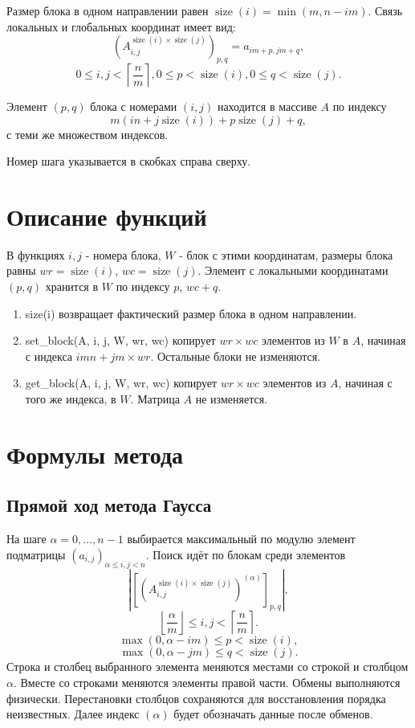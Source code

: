 \documentclass[a4paper,12pt]{article}
\begin{document}
Размер блока в одном направлении равен $\operatorname{size}(i) = \min(m, n - i m)$. Связь локальных и глобальных координат имеет вид:
\[
    \left(A_{i, j}^{\operatorname{size}(i) \times \operatorname{size}(j)} \right)_{p, q} = a_{i m + p, j m + q},
\]
\[
    0 \leq i, j < \left\lceil \frac{n}{m} \right\rceil, 0 \leq p < \operatorname{size}(i), 0 \leq q < \operatorname{size}(j).
\]

Элемент $(p, q)$ блока с номерами $(i, j)$ находится в массиве $A$ по индексу
\[
    m (i n + j \operatorname{size}(i)) + p \operatorname{size}(j) + q,
\]
с теми же множеством индексов.

Номер шага указывается в скобках справа сверху.

\section{Описание функций}
В функциях $i, j$ - номера блока, $W$ - блок с этими координатам, размеры блока равны $wr = \operatorname{size}(i)$, $wc = \operatorname{size}(j)$. Элемент с локальными координатами $(p, q)$ хранится в $W$ по индексу $p$, $wc + q$.

\begin{enumerate}
    \item size(i) возвращает фактический размер блока в одном направлении.
    \item set\_block(A, i, j, W, wr, wc) копирует $wr \times wc$ элементов из $W$ в $A$, начиная с индекса $i m n + j m \times wr$. Остальные блоки не изменяются.
    \item get\_block(A, i, j, W, wr, wc) копирует $wr \times wc$ элементов из $A$, начиная с того же индекса, в $W$. Матрица $A$ не изменяется.
\end{enumerate}

\section{Формулы метода}
\subsection{Прямой ход метода Гаусса}
На шаге $\alpha = 0, \ldots, n - 1$ выбирается максимальный по модулю элемент подматрицы $(a_{i, j})_{\alpha \leq i, j < n}$. Поиск идёт по блокам среди элементов
\[
    \left| \left[ \left(A_{i, j}^{\operatorname{size}(i) \times \operatorname{size}(j)} \right)^{(\alpha)} \right]_{p, q} \right|,
\]
\[
    \left\lfloor \frac{\alpha}{m} \right\rfloor \leq i, j < \left\lceil \frac{n}{m} \right\rceil.
\]
\[
    \max(0, \alpha - i m) \leq p < \operatorname{size}(i),
\]
\[
    \max(0, \alpha - j m) \leq q < \operatorname{size}(j).
\]
Строка и столбец выбранного элемента меняются местами со строкой и столбцом $\alpha$. Вместе со строками меняются элементы правой части. Обмены выполняются  физически. Перестановки столбцов сохраняются для восстановления порядка неизвестных. Далее индекс $(\alpha)$ будет обозначать данные после обменов.
\end{document}
